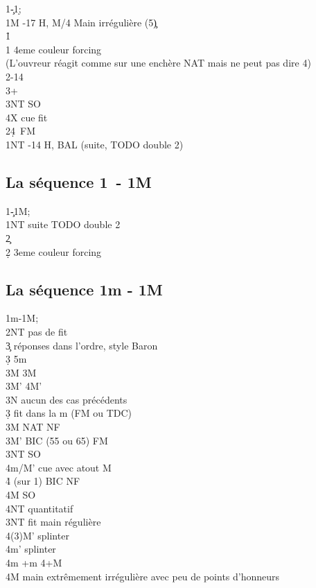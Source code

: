\documentclass[a4paper]{article}
\begin{document}
\begin{bidtable}
1\c-1\d;\\
1M -17 H, M/4 Main irrégulière (5\c )\\
1\h\+\\
1\s \> 4eme couleur forcing\\
\>(L’ouvreur réagit comme sur une enchère NAT mais ne peut pas dire 4\s ) \+\\
2\s {}-14\\
3\s {}+\+\\
3NT \> SO\\
4X \> cue fit \s \-\-\\
2\s {}\d 4\s\ FM\-\\
1NT -14 H, BAL (suite, TODO double 2)
\end{bidtable}

\subsection{La séquence 1\pdfc\ - 1M}

\begin{bidtable}
1\c-1M;\\
1NT \> suite TODO double 2\\
2\c\+\\
2\d \> 3eme couleur forcing\-
\end{bidtable}

\subsection{La séquence 1m - 1M}

\begin{bidtable}
1m-1M;\\
2NT \> pas de fit\+\\
3\c \> réponses dans l'ordre, style Baron\+\\
3\d \> 5m\\
3M \> 3M\\
\>3M' 4M'\\
\>3N aucun des cas précédents\-\\
3\d \> fit dans la m (FM ou TDC)\\
3M \> NAT NF\\
3M' \> BIC (55 ou 65) FM\\
3NT \> SO\\
4m/M' \> cue avec atout M\\
4\h \> (sur 1\s ) BIC NF\\
4M \> SO\\
4NT \> quantitatif\-\\
3NT \> fit main régulière\\
4(3)M’ \> splinter\\
4m’ \> splinter\\
4m +m 4+M\\
4M \> main extrêmement irrégulière avec peu de points d’honneurs
\end{bidtable}
\end{document}
